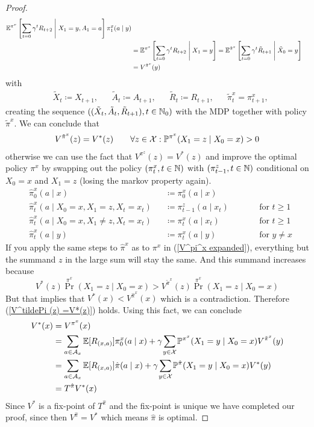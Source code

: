 \begin{proof}
\begin{align}
		\mathbb{E}^{\pi^x}\left[\sum_{t=0}\gamma^t R_{t+2}\;\middle|\; X_1=y, A_1=a\right]\pi^x_1(a\mid y)\nonumber\\
		&=\mathbb{E}^{\pi^x}\left[\sum_{t=0}\gamma^t R_{t+2}\;\middle|\; X_1=y\right]
		=\mathbb{E}^{\tilde{\pi}^x}\left[\sum_{t=0}\gamma^t \tilde{R}_{t+1}\;\middle|\; \tilde{X}_0=y\right]\nonumber\\
		&=V^{\tilde{\pi}^x}(y)
	\end{align}
	with 
	\begin{align*}
		&\tilde{X}_t\coloneqq X_{t+1}, &&\tilde{A}_t\coloneqq A_{t+1}, 
		&&\tilde{R}_t\coloneqq R_{t+1}, &&\tilde{\pi}^x_t=\pi^x_{t+1}, 
	\end{align*}
	creating the sequence 
	\(((\tilde{X}_t,\tilde{A}_t, \tilde{R}_{t+1}), t\in\mathbb{N}_0)\)  with the MDP together with policy \(\tilde{\pi}^x\). We can conclude that 
	\begin{align}
		V^{\tilde{\pi}^x}(z)=V^*(z) \qquad \forall z\in\mathcal{X}:\mathbb{P}^{\pi^x}(X_1=z\mid X_0=x)>0
		\label{V^tildePi (z) =V*(z)}
	\end{align}
	otherwise we can use the fact that \(V^{\pi^z}(z)=V^*(z)\) and improve the optimal policy \(\pi^x\) by swapping out the policy \((\pi^x_t, t\in\mathbb{N}) \) with \((\pi^z_{t-1}, t\in\mathbb{N})\) conditional on \(X_0=x\) and \(X_1=z\) (losing the markov property again). 
	\begin{align*}
			&\hat{\pi}^x_0(a\mid x)&&\coloneqq \pi^x_0(a\mid x) \\
			&\hat{\pi}^x_t(a\mid X_0=x,X_1=z, X_t=x_t)&&\coloneqq \pi^z_{t-1}(a\mid x_t) 
			\qquad && \text{for } t\ge 1\\
			&\hat{\pi}^x_t(a\mid X_0=x, X_1\neq z, X_t=x_t)&&\coloneqq \pi^x_t(a\mid x_t) 
			&& \text{for } t\ge 1 \\
			&\hat{\pi}^x_t(a\mid y)&&\coloneqq \pi^x_t(a\mid y) 
			&& \text{for } y\neq x
	\end{align*}
	If you apply the same steps to \(\hat{\pi}^x\) as to \(\pi^x\) in (\ref{V^pi^x expanded}), everything but the summand \(z\) in the large sum will stay the same. And this summand increases because 
	\[
		V^*(z)\Pr^{\pi^x}(X_1=z\mid X_0=x)> V^{\tilde{\pi}^x}(z) \Pr^{\pi^x}(X_1=z\mid X_0=x)
	\]
	But that implies that \(V^*(x)< V^{\hat{\pi}^x}(x)\) which is a contradiction. Therefore (\ref{V^tildePi (z) =V*(z)}) holds. Using this fact, we can conclude
	\begin{align*}
		V^*(x)&=V^{\pi^x}(x)\\
		&=\sum_{a\in\cA_x}\E[R_{(x,a)}]\pi_0^x(a\mid x)+\gamma \smashoperator{\sum_{y\in\cX}}\Pr^{\pi^x}(X_1=y\mid X_0=x)
		V^{\tilde{\pi}^x}(y)\\
		&=\sum_{a\in\cA_x}\E[R_{(x,a)}]\hat{\pi}(a\mid x)+\gamma \smashoperator{\sum_{y\in\cX}}\Pr^{\hat{\pi}}(X_1=y\mid X_0=x) V^*(y)\\
		&=T^{\hat{\pi}} V^* (x)
	\end{align*}
	Since \(V^*\) is a fix-point of \(T^{\hat{\pi}}\) and the fix-point is unique we have completed our proof, since then \(V^{\hat{\pi}}=V^*\) which means \(\hat{\pi}\) is optimal. 
\end{proof}

